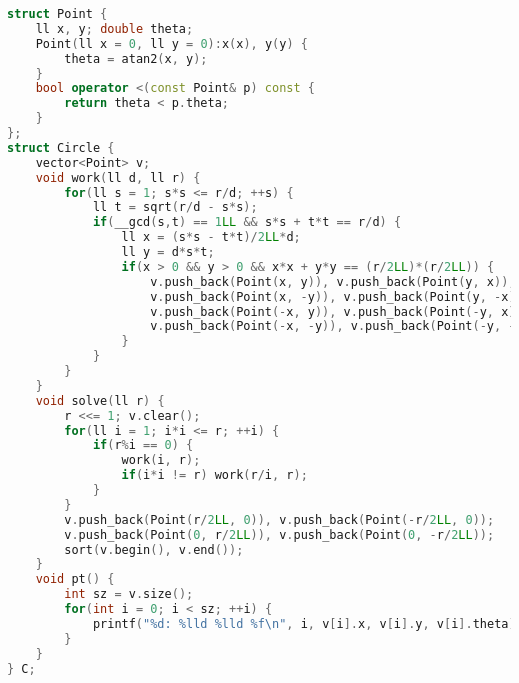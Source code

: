 \begin{lstlisting}[language=C++]
struct Point {
    ll x, y; double theta;
    Point(ll x = 0, ll y = 0):x(x), y(y) {
        theta = atan2(x, y);
    }
    bool operator <(const Point& p) const {
        return theta < p.theta;
    }
};
struct Circle {
    vector<Point> v;
    void work(ll d, ll r) {
        for(ll s = 1; s*s <= r/d; ++s) {
            ll t = sqrt(r/d - s*s);
            if(__gcd(s,t) == 1LL && s*s + t*t == r/d) {
                ll x = (s*s - t*t)/2LL*d;
                ll y = d*s*t;
                if(x > 0 && y > 0 && x*x + y*y == (r/2LL)*(r/2LL)) {
                    v.push_back(Point(x, y)), v.push_back(Point(y, x));
                    v.push_back(Point(x, -y)), v.push_back(Point(y, -x));
                    v.push_back(Point(-x, y)), v.push_back(Point(-y, x));
                    v.push_back(Point(-x, -y)), v.push_back(Point(-y, -x));
                }
            }
        }
    }
    void solve(ll r) {
        r <<= 1; v.clear();
        for(ll i = 1; i*i <= r; ++i) {
            if(r%i == 0) {
                work(i, r);
                if(i*i != r) work(r/i, r);
            }
        }
        v.push_back(Point(r/2LL, 0)), v.push_back(Point(-r/2LL, 0));
        v.push_back(Point(0, r/2LL)), v.push_back(Point(0, -r/2LL));
        sort(v.begin(), v.end());
    }
    void pt() {
        int sz = v.size();
        for(int i = 0; i < sz; ++i) {
            printf("%d: %lld %lld %f\n", i, v[i].x, v[i].y, v[i].theta);
        }
    }
} C;
\end{lstlisting}